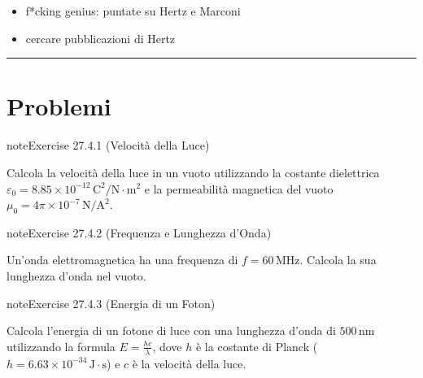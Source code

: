 \documentclass[letterpaper,10pt,italian]{jupyterBook}
\begin{document}
\sphinxAtStartPar
{}
\begin{itemize}
\item {} 
\sphinxAtStartPar
f*cking genius: puntate su Hertz e Marconi

\item {} 
\sphinxAtStartPar
cercare pubblicazioni di Hertz

\end{itemize}


\bigskip\hrule\bigskip


\sphinxstepscope


\section{Problemi}
\label{\detokenize{ch/electromagnetism/em-waves-problems:problemi}}\label{\detokenize{ch/electromagnetism/em-waves-problems:physics-hs-electromagnetism-em-waves-problems}}\label{\detokenize{ch/electromagnetism/em-waves-problems::doc}} \label{exercise:ch/electromagnetism/em-waves-problems-exercise-0}

\begin{sphinxadmonition}{note}{Exercise 27.4.1 (Velocità della Luce)}



\sphinxAtStartPar
Calcola la velocità della luce in un vuoto utilizzando la costante dielettrica \(\varepsilon_0 = 8.85 \times 10^{-12} \, \text{C}^2/\text{N} \cdot \text{m}^2\) e la permeabilità magnetica del vuoto \(\mu_0 = 4\pi \times 10^{-7} \, \text{N}/\text{A}^2\).
\end{sphinxadmonition}
 \label{exercise:ch/electromagnetism/em-waves-problems-exercise-1}

\begin{sphinxadmonition}{note}{Exercise 27.4.2 (Frequenza e Lunghezza d’Onda)}



\sphinxAtStartPar
Un’onda elettromagnetica ha una frequenza di \(f = 60 \, \text{MHz}\). Calcola la sua lunghezza d’onda nel vuoto.
\end{sphinxadmonition}
 \label{exercise:ch/electromagnetism/em-waves-problems-exercise-2}

\begin{sphinxadmonition}{note}{Exercise 27.4.3 (Energia di un Foton)}



\sphinxAtStartPar
Calcola l’energia di un fotone di luce con una lunghezza d’onda di \(500 \, \text{nm}\) utilizzando la formula \(E = \frac{h c}{\lambda}\), dove \(h\) è la costante di Planck (\(h = 6.63 \times 10^{-34} \, \text{J} \cdot \text{s}\)) e \(c\) è la velocità della luce.
\end{sphinxadmonition}
 \label{exercise:ch/electromagnetism/em-waves-problems-exercise-3}
\end{document}
